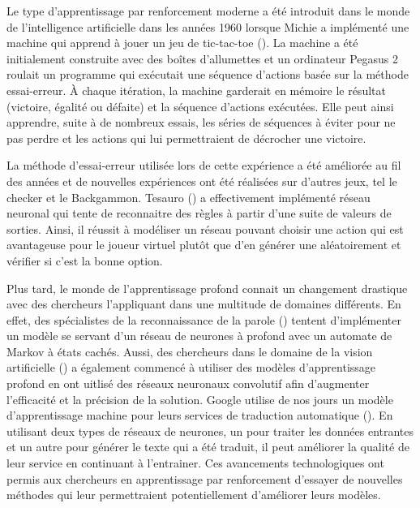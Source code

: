 \documentclass{article}
\begin{document}
Le type d'apprentissage par renforcement moderne a été introduit dans le monde de l'intelligence artificielle dans les années 1960 lorsque Michie a implémenté une machine qui apprend à jouer un jeu de tic-tac-toe (\cite{10.1093/comjnl/6.3.232}). La machine a été initialement construite avec des boîtes d'allumettes et un ordinateur Pegasus 2 roulait un programme qui exécutait une séquence d'actions basée sur la méthode essai-erreur. À chaque itération, la machine garderait en mémoire le résultat (victoire, égalité ou défaite) et la séquence d'actions exécutées. Elle peut ainsi apprendre, suite à de nombreux essais, les séries de séquences à éviter pour ne pas perdre et les actions qui lui permettraient de décrocher une victoire.
\linebreak

La méthode d'essai-erreur utilisée lors de cette expérience a été améliorée au fil des années et de nouvelles expériences ont été réalisées sur d'autres jeux, tel le checker et le	Backgammon. Tesauro (\cite{tesauro_sejnowski_1989}) a effectivement implémenté réseau neuronal qui tente de reconnaitre des règles à partir d'une suite de valeurs de sorties. Ainsi, il réussit à modéliser un réseau pouvant choisir une action qui est avantageuse pour le joueur virtuel plutôt que d'en générer une aléatoirement et vérifier si c'est la bonne option.
\linebreak

Plus tard, le monde de l'apprentissage profond connait un changement drastique avec des chercheurs l'appliquant dans une multitude de domaines différents. En effet, des spécialistes de la reconnaissance de la parole (\cite{dahl_yu_deng_acero_2012}) tentent d'implémenter un modèle se servant d'un réseau de neurones à  profond avec un  automate de Markov à états cachés. Aussi,  des chercheurs dans le domaine de la vision artificielle (\cite{krizhevsky_sutskever_hinton_2017}) a également commencé à utiliser des modèles d'apprentissage profond en ont uitlisé des réseaux neuronaux convolutif afin d'augmenter l'efficacité et la précision de la solution. Google utilise de nos jours un modèle d'apprentissage machine pour leurs services de traduction automatique (\cite{DBLP:journals/corr/WuSCLNMKCGMKSJL16}). En utilisant deux types de réseaux de neurones, un pour traiter les données entrantes et un autre pour générer le texte qui a été traduit, il peut améliorer la qualité de leur service en continuant à l'entrainer. Ces avancements technologiques ont permis aux chercheurs en apprentissage par renforcement d'essayer de nouvelles méthodes qui leur permettraient potentiellement d'améliorer leurs modèles.
\linebreak
\end{document}
